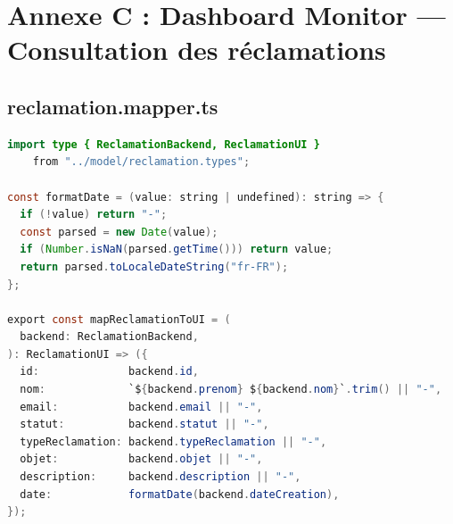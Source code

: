 \newpage
\section*{Annexe C : Dashboard Monitor — Consultation des réclamations}

\subsection*{reclamation.mapper.ts}
\begin{lstlisting}[language=Java]
import type { ReclamationBackend, ReclamationUI }
    from "../model/reclamation.types";

const formatDate = (value: string | undefined): string => {
  if (!value) return "-";
  const parsed = new Date(value);
  if (Number.isNaN(parsed.getTime())) return value;
  return parsed.toLocaleDateString("fr-FR");
};

export const mapReclamationToUI = (
  backend: ReclamationBackend,
): ReclamationUI => ({
  id:              backend.id,
  nom:             `${backend.prenom} ${backend.nom}`.trim() || "-",
  email:           backend.email || "-",
  statut:          backend.statut || "-",
  typeReclamation: backend.typeReclamation || "-",
  objet:           backend.objet || "-",
  description:     backend.description || "-",
  date:            formatDate(backend.dateCreation),
});
\end{lstlisting}
